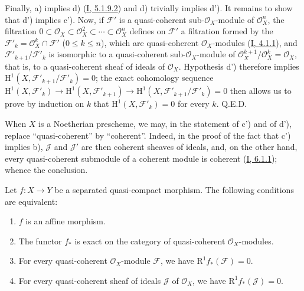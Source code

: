 Finally, a) implies d) (\hyperref[I.5.1.9.2]{I, 5.1.9.2}) and d)
trivially implies d'). It remains to show that d') implies c'). Now, if
$\mathcal{F}'$ is a quasi-coherent sub-$\mathcal{O}_X$-module of
$\mathcal{O}_X^n$, the filtration
$0\subset\mathcal{O}_X\subset\mathcal{O}_X^2\subset\cdots\subset
\mathcal{O}_X^n$ defines on $\mathcal{F}'$ a filtration formed by the
$\mathcal{F}'_k=\mathcal{O}_X^k\cap\mathcal{F}'$ ($0\leq k\leq n$), which
are quasi-coherent $\mathcal{O}_X$-modules
(\hyperref[I.4.1.1]{I, 4.1.1}), and
$\mathcal{F}'_{k+1}/\mathcal{F}'_k$ is isomorphic to a quasi-coherent
sub-$\mathcal{O}_X$-module of
$\mathcal{O}_X^{k+1}/\mathcal{O}_X^k=\mathcal{O}_X$, that is, to a
quasi-coherent sheaf of ideals of $\mathcal{O}_X$. Hypothesis d')
therefore implies
$\mathrm{H}^1(X,\mathcal{F}'_{k+1}/\mathcal{F}'_k)=0$; the exact cohomology
sequence
$\mathrm{H}^1(X,\mathcal{F}'_k)\to\mathrm{H}^1(X,\mathcal{F}'_{k+1})
\to\mathrm{H}^1(X,\mathcal{F}'_{k+1}/\mathcal{F}'_k)=0$ then allows us to
prove by induction on $k$ that
$\mathrm{H}^1(X,\mathcal{F}'_k)=0$ for every $k$. Q.E.D.

\begin{remark}[5.2.1.1]
\label{II.5.2.1.1}
When $X$ is a Noetherian prescheme, we may, in the statement of c') and of
d'), replace ``quasi-coherent'' by ``coherent''. Indeed, in the proof of
the fact that c') implies b), $\mathcal{J}$ and $\mathcal{J}'$
are then coherent sheaves of ideals, and, on the other hand, every
quasi-coherent submodule of a coherent module is coherent
(\hyperref[I.6.1.1]{I, 6.1.1}); whence the conclusion.
\end{remark}

\begin{corollary}[5.2.2]
\label{II.5.2.2}
Let $f:X\to Y$ be a separated quasi-compact morphism. The following
conditions are equivalent:
\begin{enumerate}
  \item[\rm{a)}] $f$ is an affine morphism.
  \item[\rm{b)}] The functor $f_*$ is exact on the category of
  quasi-coherent $\mathcal{O}_X$-modules.
  \item[\rm{c)}] For every quasi-coherent $\mathcal{O}_X$-module
  $\mathcal{F}$, we have $\mathrm{R}^1f_*(\mathcal{F})=0$.
  \item[\rm{c')}] For every quasi-coherent sheaf of ideals $\mathcal{J}$
  of $\mathcal{O}_X$, we have $\mathrm{R}^1f_*(\mathcal{J})=0$.
\end{enumerate}
\end{corollary}

